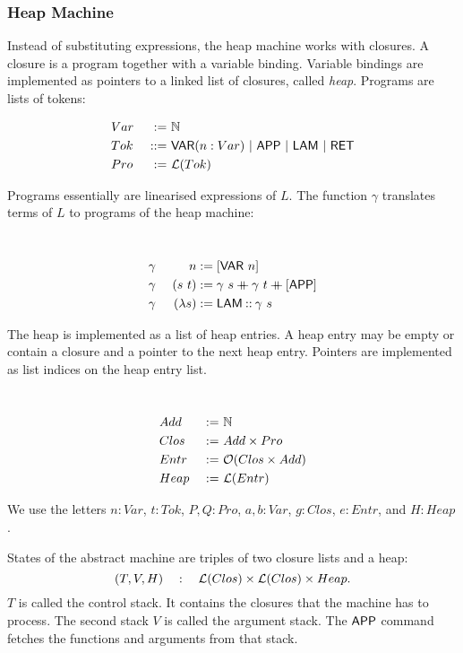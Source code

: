\subsubsection{Heap Machine}
\label{sec:heap-def}

Instead of substituting expressions, the heap machine works with closures.  A closure is a program together with a variable binding.  Variable
bindings are implemented as pointers to a linked list of closures, called \emph{heap}.  Programs are lists of tokens:
\begin{definition}[Program]
  \label{def:Tok}
  \begin{alignat*}{2}
    &Var  &~:=~& \mathbb{N} \\
    &Tok  &~::=~& \mathsf{VAR}(n:Var) ~|~ \mathsf{APP} ~|~ \mathsf{LAM} ~|~ \mathsf{RET} \\
    &Pro  &~:=~& \mathcal{L}(Tok)
  \end{alignat*}
\end{definition}

Programs essentially are linearised expressions of $L$.  The function $\gamma$ translates terms of $L$ to programs of the heap machine:
\begin{definition}
  ~
  \begin{alignat*}{2}
    &\gamma&~n           &:= [\mathsf{VAR}~n] \\
    &\gamma&~(s~t)       &:= \gamma~s \mathbin{+\mkern-10mu+} \gamma~t \mathbin{+\mkern-10mu+} [\mathsf{APP}] \\
    &\gamma&~(\lambda s) &:= \mathsf{LAM} \mathbin{::} \gamma~s
  \end{alignat*}
\end{definition}

The heap is implemented as a list of heap entries.  A heap entry may be empty or contain a closure and a pointer to the next heap entry.  Pointers are
implemented as list indices on the heap entry list.
\begin{definition}
  \label{def:Heap}
  ~
  \begin{alignat*}{2}
    &Add  &~:=~& \mathbb{N} \\
    &Clos &~:=~& Add \times Pro \\
    &Entr &~:=~& \mathcal{O}(Clos \times Add) \\
    &Heap &~:=~& \mathcal{L}(Entr)
  \end{alignat*}
\end{definition}
We use the letters $n:Var$, $t:Tok$, $P,Q:Pro$, $a,b:Var$, $g:Clos$, $e:Entr$, and $H:Heap$.

States of the abstract machine are triples of two closure lists and a heap:
\[
  (T, V, H) \quad:\quad \mathcal{L}(Clos) \times \mathcal{L}(Clos) \times Heap.
\]
$T$ is called the control stack.  It contains the closures that the machine has to process.  The second stack $V$ is called the argument stack.  The
$\mathsf{APP}$ command fetches the functions and arguments from that stack.


